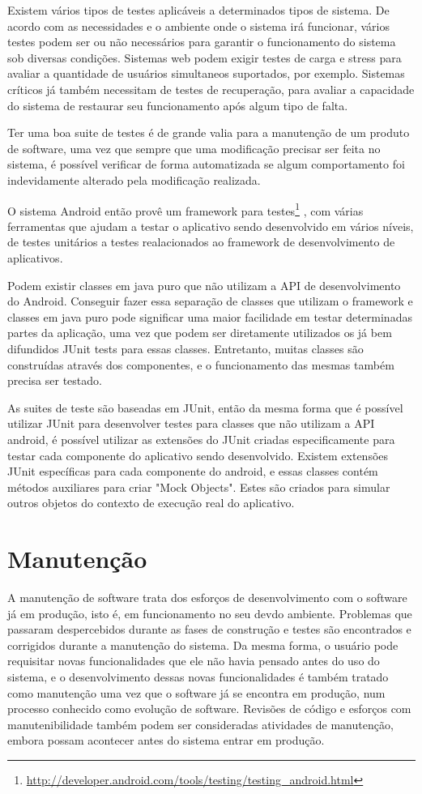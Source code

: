 Existem vários tipos de testes aplicáveis a determinados tipos de sistema. De acordo com as necessidades e o ambiente onde o sistema irá funcionar, vários testes podem ser ou não necessários para garantir o funcionamento do sistema sob diversas condições. Sistemas web podem exigir testes de carga e stress para avaliar a quantidade de usuários simultaneos suportados, por exemplo. Sistemas críticos já também necessitam de testes de recuperação, para avaliar a capacidade do sistema de restaurar seu funcionamento após algum tipo de falta.

Ter uma boa suite de testes é de grande valia para a manutenção de um produto de software, uma vez que sempre que uma modificação precisar ser feita no sistema, é possível verificar de forma automatizada se algum comportamento foi indevidamente alterado pela modificação realizada.

O sistema Android então provê um framework para testes\footnote{\url{http://developer.android.com/tools/testing/testing\_android.html}} , com várias ferramentas que ajudam a testar o aplicativo sendo desenvolvido em vários níveis, de testes unitários a testes realacionados ao framework de desenvolvimento de aplicativos. 

Podem existir classes em java puro que não utilizam a API de desenvolvimento do Android. Conseguir fazer essa separação de classes que utilizam o framework e classes em java puro pode significar uma maior facilidade em testar determinadas partes da aplicação, uma vez que podem ser diretamente utilizados os já bem difundidos JUnit tests para essas classes. Entretanto, muitas classes são construídas através dos componentes, e o funcionamento das mesmas também precisa ser testado.

As suites de teste são baseadas em JUnit, então da mesma forma que é possível utilizar JUnit para desenvolver testes para classes que não utilizam a API android, é possível utilizar as extensões do JUnit criadas especificamente para testar cada componente do aplicativo sendo desenvolvido. Existem extensões JUnit específicas para cada componente do android, e essas classes contém métodos auxiliares para criar "Mock Objects". Estes são criados para simular outros objetos do contexto de execução real do aplicativo.


\section{Manutenção}

A manutenção de software trata dos esforços de desenvolvimento com o software já em produção, isto é, em funcionamento no seu devdo ambiente. Problemas que passaram despercebidos durante as fases de construção e testes são encontrados e corrigidos durante a manutenção do sistema. Da mesma forma, o usuário pode requisitar novas funcionalidades que ele não havia pensado antes do uso do sistema, e o desenvolvimento dessas novas funcionalidades é também tratado como manutenção uma vez que o software já se encontra em produção, num processo conhecido como evolução de software. Revisões de código e esforços com manutenibilidade também podem ser consideradas atividades de manutenção, embora possam acontecer antes do sistema entrar em produção.

